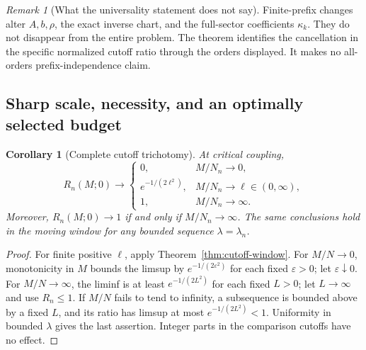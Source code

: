 \documentclass[11pt,a4paper]{article}
\numberwithin{equation}{section}
\newtheorem{corollary}[theorem]{Corollary}
\theoremstyle{definition}
\theoremstyle{remark}
\newtheorem{remark}[theorem]{Remark}
\begin{document}
\begin{remark}[What the universality statement does not say]
Finite-prefix changes alter \(A,b,\rho\), the exact inverse chart, and the
full-sector coefficients \(\kappa_k\). They do not disappear from the
entire problem. The theorem identifies the cancellation in the specific
normalized cutoff ratio through the orders displayed. It makes no
all-orders prefix-independence claim.
\end{remark}

\subsection{Sharp scale, necessity, and an optimally selected budget}
\begin{corollary}[Complete cutoff trichotomy]
\label{cor:trichotomy}
At critical coupling,
\begin{equation}
 R_n(M;0)\longrightarrow
 \begin{cases}
 0,&M/N_n\longrightarrow0,\\
 e^{-1/(2\ell^2)},&M/N_n\longrightarrow\ell\in(0,\infty),\\
 1,&M/N_n\longrightarrow\infty.
 \end{cases}
 \label{eq:trichotomy}
\end{equation}
Moreover, \(R_n(M;0)\to1\) if and only if \(M/N_n\to\infty\).
The same conclusions hold in the moving window for any bounded sequence
\(\lambda=\lambda_n\).
\end{corollary}
\begin{proof}
For finite positive \(\ell\), apply Theorem~\ref{thm:cutoff-window}.
For \(M/N\to0\), monotonicity in \(M\) bounds the limsup by
\(e^{-1/(2\varepsilon^2)}\) for each fixed \(\varepsilon>0\); let
\(\varepsilon\downarrow0\). For \(M/N\to\infty\), the liminf is at least
\(e^{-1/(2L^2)}\) for each fixed \(L>0\); let \(L\to\infty\) and use
\(R_n\le1\). If \(M/N\) fails to tend to infinity, a subsequence is bounded
above by a fixed \(L\), and its ratio has limsup at most
\(e^{-1/(2L^2)}<1\). Uniformity in bounded \(\lambda\) gives the last
assertion. Integer parts in the comparison cutoffs have no effect.
\end{proof}
\end{document}
